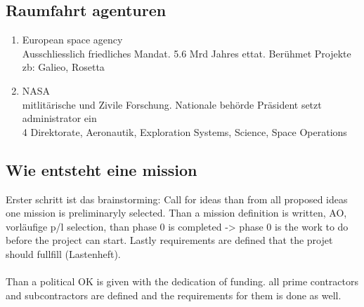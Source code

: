 \subsection{Raumfahrt agenturen}
\begin{enumerate}
    \item European space agency\\
    Ausschliesslich friedliches Mandat. 5.6 Mrd Jahres ettat. Berühmet Projekte zb: Galieo, Rosetta
    \item NASA \\
    mitlitärische und Zivile Forschung. Nationale behörde Präsident setzt administrator ein\\ 4 Direktorate, Aeronautik, Exploration Systems, Science, Space Operations
\end{enumerate}
\subsection{Wie entsteht eine mission}
Erster schritt ist das brainstorming: Call for ideas than from all proposed ideas one mission is preliminaryly selected. Than a mission definition is written, \ac{AO}, vorläufige \ac{p/l} selection, than phase 0 is completed -> phase 0 is the work to do before the project can start. Lastly requirements are defined that the projet should fullfill (Lastenheft).
\\\\
Than a political OK is given with the dedication of funding. all prime contractors and subcontractors are defined and the requirements for them is done as well.
